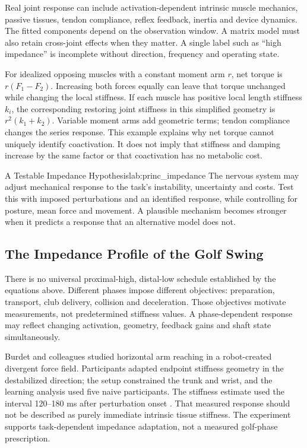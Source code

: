 Real joint response can include activation-dependent intrinsic muscle mechanics, passive tissues, tendon compliance, reflex feedback, inertia and device dynamics. The fitted components depend on the observation window. A matrix model must also retain cross-joint effects when they matter. A single label such as ``high impedance'' is incomplete without direction, frequency and operating state.

For idealized opposing muscles with a constant moment arm $r$, net torque is $r(F_1-F_2)$. Increasing both forces equally can leave that torque unchanged while changing the local stiffness. If each muscle has positive local length stiffness $k_i$, the corresponding restoring joint stiffness in this simplified geometry is $r^2(k_1+k_2)$. Variable moment arms add geometric terms; tendon compliance changes the series response. This example explains why net torque cannot uniquely identify coactivation. It does not imply that stiffness and damping increase by the same factor or that coactivation has no metabolic cost.

\begin{principle}{A Testable Impedance Hypothesis}{lab:princ_impedance}
The nervous system may adjust mechanical response to the task's instability, uncertainty and costs. Test this with imposed perturbations and an identified response, while controlling for posture, mean force and movement. A plausible mechanism becomes stronger when it predicts a response that an alternative model does not.
\end{principle}

\subsection{The Impedance Profile of the Golf Swing}
\label{subsec:impedance_profile}

There is no universal proximal-high, distal-low schedule established by the equations above. Different phases impose different objectives: preparation, transport, club delivery, collision and deceleration. Those objectives motivate measurements, not predetermined stiffness values. A phase-dependent response may reflect changing activation, geometry, feedback gains and shaft state simultaneously.

Burdet and colleagues studied horizontal arm reaching in a robot-created divergent force field. Participants adapted endpoint stiffness geometry in the destabilized direction; the setup constrained the trunk and wrist, and the learning analysis used five naive participants. The stiffness estimate used the interval 120--180 ms after perturbation onset \citep{Burdet2001Impedance}. That measured response should not be described as purely immediate intrinsic tissue stiffness. The experiment supports task-dependent impedance adaptation, not a measured golf-phase prescription.

